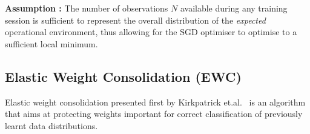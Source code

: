 \noindent\textbf{Assumption \assumptionSGDfirst:} The number of observations $N$ available during any training session is sufficient to represent the overall distribution of the \textit{expected} operational environment, thus allowing for the SGD optimiser to optimise to a sufficient local minimum.

%

%






\subsection{Elastic Weight Consolidation (EWC)}
Elastic weight consolidation presented first by Kirkpatrick et.al.~\cite{Kirkpatrick2017} is an algorithm that aims at protecting weights important for correct classification of previously learnt data distributions. 
%
%
%
%
%

